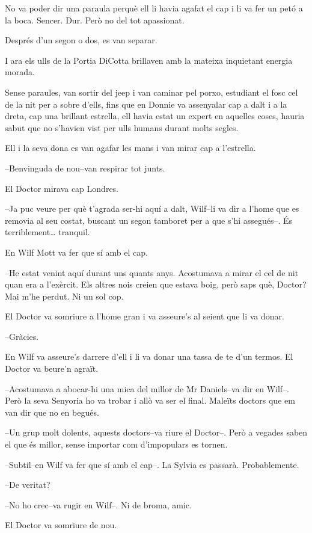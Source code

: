 No va poder dir una paraula perquè ell li havia agafat el cap i li va
fer un petó a la boca. Sencer. Dur. Però no del tot apassionat.

Després d'un segon o dos, es van separar.

I ara els ulls de la Portia DiCotta brillaven amb la mateixa inquietant
energia morada.

Sense paraules, van sortir del jeep i van caminar pel porxo, estudiant
el fosc cel de la nit per a sobre d'ells, fins que en Donnie va
assenyalar cap a dalt i a la dreta, cap una brillant estrella, ell havia
estat un expert en aquelles coses, hauria sabut que no s'havien vist per
ulls humans durant molts segles.

Ell i la seva dona es van agafar les mans i van mirar cap a l'estrella.

--Benvinguda de nou--van respirar tot junts.

El Doctor mirava cap Londres.

--Ja puc veure per què t'agrada ser-hi aquí a dalt, Wilf--li va dir a
l'home que es removia al seu costat, buscant un segon tamboret per a que
s'hi assegués--. És terriblement\ldots{} tranquil.

En Wilf Mott va fer que sí amb el cap.

--He estat venint aquí durant uns quants anys. Acostumava a mirar el cel
de nit quan era a l'exèrcit. Els altres nois creien que estava boig,
però saps què, Doctor? Mai m'he perdut. Ni un sol cop.

El Doctor va somriure a l'home gran i va asseure's al seient que li va
donar.

--Gràcies.

En Wilf va asseure's darrere d'ell i li va donar una tassa de te d'un
termos. El Doctor va beure'n agraït.

--Acostumava a abocar-hi una mica del millor de Mr Daniels--va dir en
Wilf--. Però la seva Senyoria ho va trobar i allò va ser el final.
Maleïts doctors que em van dir que no en begués.

--Un grup molt dolents, aquests doctors--va riure el Doctor--. Però a
vegades saben el que és millor, sense importar com d'impopulars es
tornen.

--Subtil--en Wilf va fer que sí amb el cap--. La Sylvia es passarà.
Probablemente.

--De veritat?

--No ho crec--va rugir en Wilf--. Ni de broma, amic.

El Doctor va somriure de nou.

